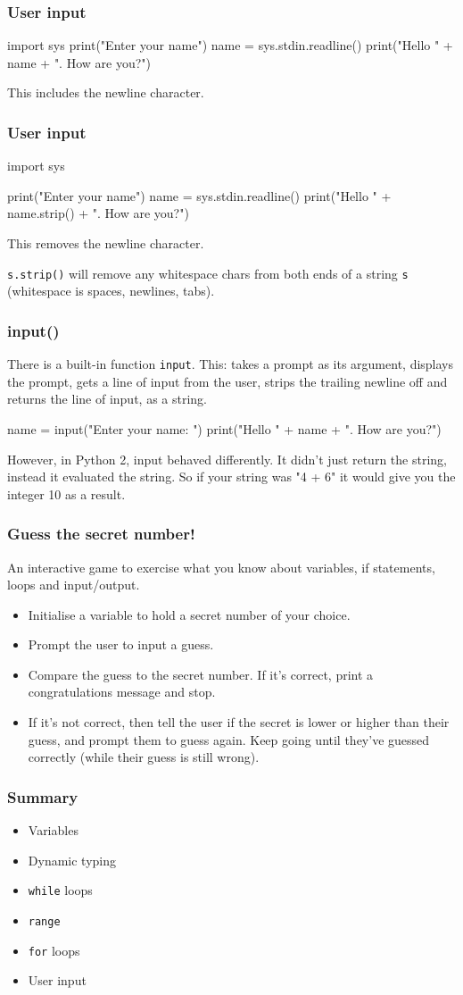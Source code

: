 \documentclass{beamer}
\begin{document}
\begin{frame}[fragile]
\frametitle{User input}
\begin{code}
import sys
print("Enter your name")
name = sys.stdin.readline()
print("Hello " + name + ". How are you?")
\end{code}
This includes the newline character.
\end{frame}

\begin{frame}[fragile]
\frametitle{User input}
\begin{code}
import sys

print("Enter your name")
name = sys.stdin.readline()
print("Hello " + name.strip() + ". How are you?")
\end{code}
This removes the newline character.

\texttt{s.strip()} will remove any whitespace chars from both ends of a
string \texttt{s} (whitespace is spaces, newlines, tabs).
\end{frame}

\begin{frame}[fragile]
\frametitle{input()}
There is a built-in function \texttt{input}. This:
takes a prompt as
its argument, displays the prompt, 
gets a line of input from the user,
strips the trailing newline off 
and returns the line of input, as a string.
\begin{code}
name = input("Enter your name: ")
print("Hello " + name + ". How are you?")
\end{code}

However, in Python 2, input behaved differently. It didn't just return
the string, instead it evaluated the string. So if your string was "4
+ 6" it would give you the integer 10 as a result. 
\end{frame}


\begin{frame}
\frametitle{Guess the secret number!}
An interactive game to exercise what you know about
variables, if statements, loops and input/output.
\begin{itemize}
\item Initialise a variable to hold a secret number of your
choice.
\item Prompt the user to input a guess.
\item Compare the guess to the secret number. If it's
correct, print a congratulations message and stop.
\item If it's not correct, then tell the user if the secret is
lower or higher than their guess, and prompt them to
guess again. Keep going until they've guessed
correctly (while their guess is still wrong).
\end{itemize}
\end{frame}


\begin{frame}
\frametitle{Summary}
\begin{itemize}
\item Variables
\item Dynamic typing
\item \texttt{while} loops
\item \texttt{range}
\item \texttt{for} loops
\item User input
\end{itemize}
\end{frame}
\end{document}
